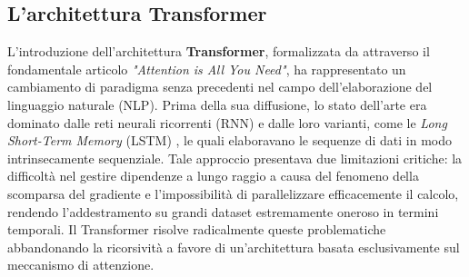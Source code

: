 \subsection{L'architettura Transformer}
\label{subsec:transformer}

L'introduzione dell'architettura \textbf{Transformer}, formalizzata da \citet{vaswani2017attention} attraverso il fondamentale articolo \textit{"Attention is All You Need"}, ha rappresentato un cambiamento di paradigma senza precedenti nel campo dell'elaborazione del linguaggio naturale (NLP). Prima della sua diffusione, lo stato dell'arte era dominato dalle reti neurali ricorrenti (RNN) e dalle loro varianti, come le \textit{Long Short-Term Memory} (LSTM) \cite{hochreiter1997long}, le quali elaboravano le sequenze di dati in modo intrinsecamente sequenziale. Tale approccio presentava due limitazioni critiche: la difficoltà nel gestire dipendenze a lungo raggio a causa del fenomeno della scomparsa del gradiente e l'impossibilità di parallelizzare efficacemente il calcolo, rendendo l'addestramento su grandi dataset estremamente oneroso in termini temporali. Il Transformer risolve radicalmente queste problematiche abbandonando la ricorsività a favore di un'architettura basata esclusivamente sul meccanismo di attenzione.

